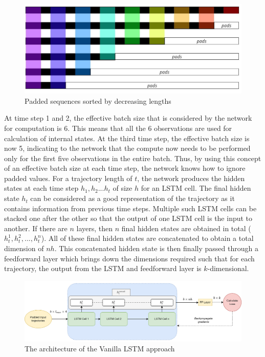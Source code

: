 \documentclass{article}
\begin{document}
\begin{figure}[H]
\centering
\includegraphics[scale=0.2]{method/pads.png}
\caption{Padded sequences sorted by decreasing lengths}
\end{figure}



At time step 1 and 2, the effective batch size that is considered by the network for computation is 6. This means that all the 6 observations are used for calculation of internal states. At the third time step, the effective batch size is now 5, indicating to the network that the compute now needs to be performed only for the first five observations in the entire batch. Thus, by using this concept of an effective batch size at each time step, the network knows how to ignore padded values. For a trajectory length of $t$, the network produces the hidden states at each time step $h_1,h_2...h_t$ of size $h$ for an LSTM cell. The final hidden state $h_t$ can be considered as a good representation of the trajectory as it contains information from previous time steps. Multiple such LSTM cells can be stacked one after the other so that the output of one LSTM cell is the input to another. If there are $n$ layers, then $n$ final hidden states are obtained in total ($h_t^1,h_t^2,...,h_t^n$). All of these final hidden states are concatenated to obtain a total dimension of $nh$. This concatenated hidden state is then finally passed through a feedforward layer which brings down the dimensions required such that for each trajectory, the output from the LSTM and feedforward layer is $k$-dimensional.

\begin{figure}[H]
\centering
\includegraphics[scale=0.2]{method/lstm.png}
\caption{The architecture of the Vanilla LSTM approach}
\end{figure}
\end{document}
